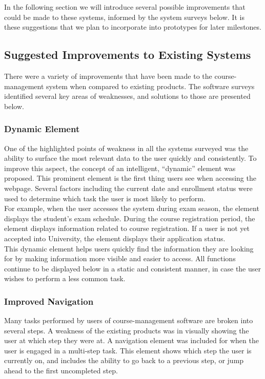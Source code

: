 \documentclass[10pt]{article}
\begin{document}
\begin{multicols}{2}
In the following section we will introduce several possible improvements that 
could be made to these systems, informed by the system surveys below. It is 
these suggestions that we plan to incorporate into prototypes for later 
milestones.

\subsection*{Suggested Improvements to Existing Systems}
There were a variety of improvements that have been made to the course-management 
system when compared to existing products. The software surveys identified 
several key areas of weaknesses, and solutions to those are presented below.

\subsubsection*{Dynamic Element}
One of the highlighted points of weakness in all the systems surveyed was the 
ability to surface the most relevant data to the user quickly and consistently. 
To improve this aspect, the concept of an intelligent, ``dynamic'' element was 
proposed. This prominent element is the first thing users see when 
accessing the webpage. Several factors including the current date and enrollment 
status were used to determine which task the user is most likely to perform.\\

For example, when the user accesses the system during exam season, the element 
 displays the student's exam schedule. During the course registration period, 
the element displays information related to course registration. If a user 
is not yet accepted into University, the element displays their application 
status.\\

This dynamic element helps users quickly find the information they are 
looking for by making information more visible and easier to access. All functions continue to be 
displayed below in a static and consistent manner, in case the user wishes to perform a less common task.

\subsubsection*{Improved Navigation}
Many tasks performed by users of course-management software are broken into 
several steps. A weakness of the existing products was in visually showing the 
user at which step they were at. A navigation element was included for when the user is engaged in a multi-step task. This element shows which step the user is currently on, and includes the ability to 
go back to a previous step, or jump ahead to the first uncompleted step.\\


\end{multicols}
\end{document}

